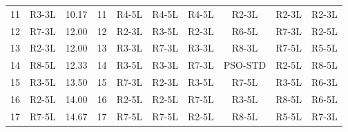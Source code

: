 \documentclass[runningheads]{llncs}
\begin{document}
\begin{table}[H]
{\begin{tabular}{rlc @{\hspace{10pt}} |c|cccccc}
11 & R3-3L          & 10.17 & 11 & R4-5L            & R4-5L            & R4-5L            & R2-3L            & R2-3L            & R2-3L          \\
12 & R7-3L          & 12.00 & 12 & R2-3L            & R3-5L            & R2-3L            & R6-5L            & R7-3L            & R2-5L          \\
13 & R2-3L          & 12.00 & 13 & R3-3L            & R7-3L            & R3-3L            & R8-3L            & R7-5L            & R5-5L          \\
14 & R8-5L          & 12.33 & 14 & R3-5L            & R3-3L            & R7-3L            & PSO-STD          & R2-5L            & R8-5L          \\
15 & R3-5L          & 13.50 & 15 & R7-3L            & R2-3L            & R3-5L            & R7-5L            & R3-5L            & R6-3L          \\
16 & R2-5L          & 14.00 & 16 & R2-5L            & R2-5L            & R7-5L            & R3-5L            & R8-5L            & R6-5L          \\
17 & R7-5L          & 14.67 & 17 & R7-5L            & R7-5L            & R2-5L            & R8-5L            & R5-5L            & R7-3L          \\
\bottomrule
\end{tabular}}
\end{table}


\end{document}
